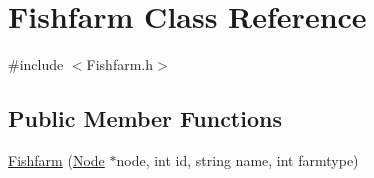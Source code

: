 \hypertarget{class_fishfarm}{}\section{Fishfarm Class Reference}
\label{class_fishfarm}


{\ttfamily \#include $<$Fishfarm.\+h$>$}

\subsection*{Public Member Functions}
\begin{DoxyCompactItemize}
\item 
\mbox{\hyperlink{class_fishfarm_aa5fcac76457a2def37af1e16101c5110}{Fishfarm}} (\mbox{\hyperlink{class_node}{Node}} $\ast$node, int id, string name, int farmtype)
\item 

\end{DoxyCompactItemize}
